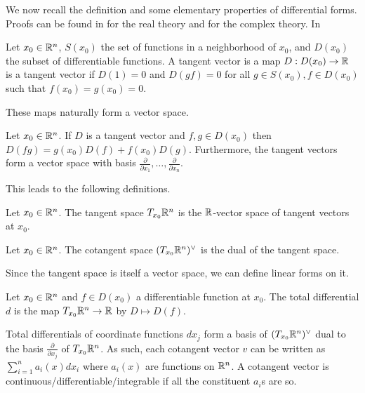 We now recall the definition and some elementary properties of differential forms. Proofs can be found in \cite{LeeSM} for the real theory and \cite{LeeCM} for the complex theory. In
\begin{definition}\label{def: tangent vector}
    Let $x_{0}\in\mathbb{R}^{n}$, $S(x_{0})$ the set of functions in a neighborhood of $x_{0}$, and $D(x_{0})$ the subset of differentiable functions. A tangent vector is a map $D:D(x_{0})\to\mathbb{R}$ is a tangent vector if $D(1)=0$ and $D(gf)=0$ for all $g\in S(x_{0}),f\in D(x_{0})$ such that $f(x_{0})=g(x_{0})=0$. 
\end{definition}
These maps naturally form a vector space. 
\begin{proposition}\label{prop: Leibniz rule and tangent space}
    Let $x_{0}\in\mathbb{R}^{n}$. If $D$ is a tangent vector and $f,g\in D(x_{0})$ then $D(fg)=g(x_{0})D(f)+f(x_{0})D(g)$. Furthermore, the tangent vectors form a vector space with basis $\frac{\partial}{\partial x_{1}},\dots,\frac{\partial}{\partial x_{n}}$. 
\end{proposition}
This leads to the following definitions. 
\begin{definition}\label{def: real tangent space}
    Let $x_{0}\in\mathbb{R}^{n}$. The tangent space $T_{x_{0}}\mathbb{R}^{n}$ is the $\mathbb{R}$-vector space of tangent vectors at $x_{0}$. 
\end{definition}
\begin{definition}\label{def: real cotangent space}
    Let $x_{0}\in\mathbb{R}^{n}$. The cotangent space $(T_{x_{0}}\mathbb{R}^{n})^{\vee}$ is the dual of the tangent space. 
\end{definition}
Since the tangent space is itself a vector space, we can define linear forms on it. 
\begin{definition}\label{def: total differential}
    Let $x_{0}\in\mathbb{R}^{n}$ and $f\in D(x_{0})$ a differentiable function at $x_{0}$. The total differential $d$ is the map $T_{x_{0}}\mathbb{R}^{n}\to\mathbb{R}$ by $D\mapsto D(f)$. 
\end{definition}
\begin{remark}\label{rmk: basis of cotangent space}
    Total differentials of coordinate functions $dx_{j}$ form a basis of $(T_{x_{0}}\mathbb{R}^{n})^{\vee}$ dual to the basis $\frac{\partial}{\partial x_{j}}$ of $T_{x_{0}}\mathbb{R}^{n}$. As such, each cotangent vector $v$ can be written as $\sum_{i=1}^{n}a_{i}(x)dx_{i}$ where $a_{i}(x)$ are functions on $\mathbb{R}^{n}$. A cotangent vector is continuous/differentiable/integrable if all the constituent $a_{i}$s are so. 
\end{remark}
